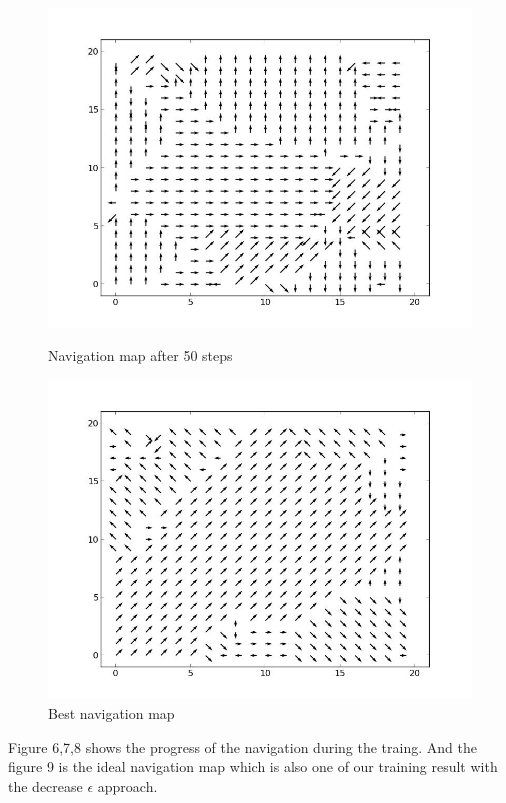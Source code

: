 \documentclass[a4paper, 12pt]{article}
\begin{document}
\begin{figure}
\begin{minipage}[c]{0.5\textwidth}
    \includegraphics[scale=0.3]{../figure/navMp50.jpeg}
  \caption{Navigation map after 50 steps}
  \end{minipage}%
  \begin{minipage}[c]{0.5\textwidth}
    \centering
    \includegraphics[scale=0.3]{../figure/navMap.jpeg}
  \caption{Best navigation map}
  \end{minipage}
\end{figure}

Figure 6,7,8 shows the progress of the navigation during the traing. And the figure 9 is the ideal navigation map which is also one of our training result with the decrease $\epsilon$ approach.
\end{document}
